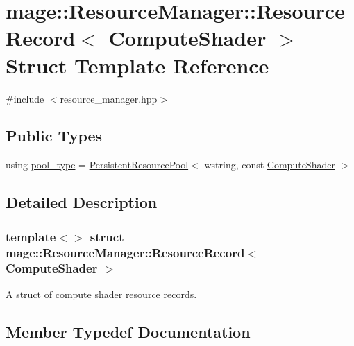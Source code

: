\hypertarget{structmage_1_1_resource_manager_1_1_resource_record_3_01_compute_shader_01_4}{}\section{mage\+:\+:Resource\+Manager\+:\+:Resource\+Record$<$ Compute\+Shader $>$ Struct Template Reference}
\label{structmage_1_1_resource_manager_1_1_resource_record_3_01_compute_shader_01_4}


{\ttfamily \#include $<$resource\+\_\+manager.\+hpp$>$}

\subsection*{Public Types}
\begin{DoxyCompactItemize}
\item 
using \hyperlink{structmage_1_1_resource_manager_1_1_resource_record_3_01_compute_shader_01_4_a3fa00db899c9383720d711280ca50760}{pool\+\_\+type} = \hyperlink{classmage_1_1_persistent_resource_pool}{Persistent\+Resource\+Pool}$<$ wstring, const \hyperlink{namespacemage_ae040329401484b076f0cd1a7c43d19c9}{Compute\+Shader} $>$
\end{DoxyCompactItemize}


\subsection{Detailed Description}
\subsubsection*{template$<$$>$\newline
struct mage\+::\+Resource\+Manager\+::\+Resource\+Record$<$ Compute\+Shader $>$}

A struct of compute shader resource records. 

\subsection{Member Typedef Documentation}
\hypertarget{structmage_1_1_resource_manager_1_1_resource_record_3_01_compute_shader_01_4_a3fa00db899c9383720d711280ca50760}{}\label{structmage_1_1_resource_manager_1_1_resource_record_3_01_compute_shader_01_4_a3fa00db899c9383720d711280ca50760} 
